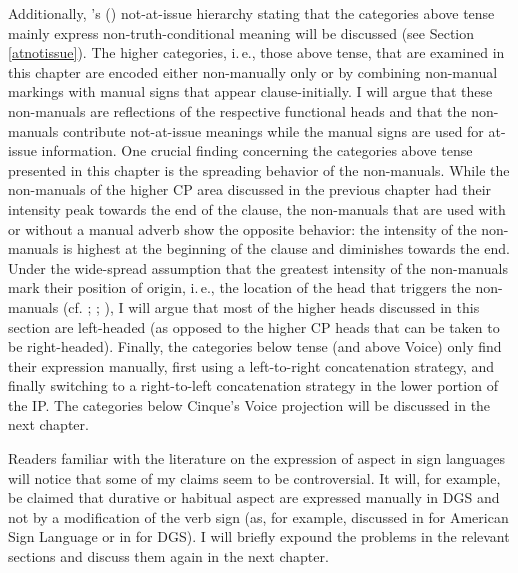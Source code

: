 Additionally, \citeauthor{bross2017scope}'s (\citeyear{bross2017scope}) not-at-issue hierarchy stating that the categories above tense mainly express non-truth-conditional meaning will be discussed (see Section \ref{atnotissue}). The higher categories, i.\,e., those above tense, that are examined in this chapter are encoded either non-manually only or by combining non-manual markings with manual signs that appear clause-initially. I will argue that these non-manuals are reflections of the respective functional heads and that the non-manuals contribute not-at-issue meanings while the manual signs are used for at-issue information. One crucial finding concerning the categories above tense presented in this chapter is the spreading behavior of the non-manuals. While the non-manuals of the higher CP area discussed in the previous chapter had their intensity peak towards the end of the clause, the non-manuals that are used with or without a manual adverb show the opposite behavior: the intensity of the non-manuals is highest at the beginning of the clause and diminishes towards the end. Under the wide-spread assumption that the greatest intensity of the non-manuals mark their position of origin, i.\,e., the location of the head that triggers the non-manuals (cf. \citealt{bahan1996, petronio1997}; \citealt[43--45]{neidle2000syntax}; \citealt[311--312]{sandler2006sign}), I will argue that most of the higher heads discussed in this section are left-headed (as opposed to the higher CP heads that can be taken to be right-headed). Finally, the categories below tense (and above Voice) only find their expression manually, first using a left-to-right concatenation strategy, and finally switching to a right-to-left concatenation strategy in the lower portion of the IP. The categories below Cinque's Voice projection will be discussed in the next chapter. %

Readers familiar with the literature on the expression of aspect in sign languages will notice that some of my claims seem to be controversial. It will, for example, be claimed that durative or habitual aspect are expressed manually in DGS and not by a modification of the verb sign (as, for example, discussed in \citealt{rathmann2005event} for American Sign Language or in \citealt{happ2014vork}  for DGS). I will briefly expound the problems in the relevant sections and discuss them again in the next chapter. 

